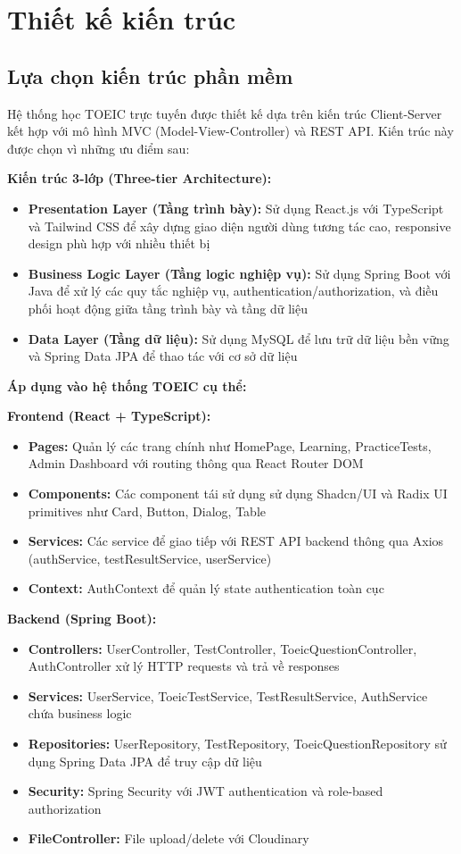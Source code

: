 \documentclass[../DoAn.tex]{subfiles}
\begin{document}
\section{Thiết kế kiến trúc}
\subsection{Lựa chọn kiến trúc phần mềm}

Hệ thống học TOEIC trực tuyến được thiết kế dựa trên kiến trúc Client-Server kết hợp với mô hình MVC (Model-View-Controller) và REST API. Kiến trúc này được chọn vì những ưu điểm sau:

\textbf{Kiến trúc 3-lớp (Three-tier Architecture):}
\begin{itemize}
    \item \textbf{Presentation Layer (Tầng trình bày):} Sử dụng React.js với TypeScript và Tailwind CSS để xây dựng giao diện người dùng tương tác cao, responsive design phù hợp với nhiều thiết bị
    \item \textbf{Business Logic Layer (Tầng logic nghiệp vụ):} Sử dụng Spring Boot với Java để xử lý các quy tắc nghiệp vụ, authentication/authorization, và điều phối hoạt động giữa tầng trình bày và tầng dữ liệu
    \item \textbf{Data Layer (Tầng dữ liệu):} Sử dụng MySQL để lưu trữ dữ liệu bền vững và Spring Data JPA để thao tác với cơ sở dữ liệu
\end{itemize}

\textbf{Áp dụng vào hệ thống TOEIC cụ thể:}

\textbf{Frontend (React + TypeScript):}
\begin{itemize}
    \item \textbf{Pages:} Quản lý các trang chính như HomePage, Learning, PracticeTests, Admin Dashboard với routing thông qua React Router DOM
    \item \textbf{Components:} Các component tái sử dụng sử dụng Shadcn/UI và Radix UI primitives như Card, Button, Dialog, Table
    \item \textbf{Services:} Các service để giao tiếp với REST API backend thông qua Axios (authService, testResultService, userService)
    \item \textbf{Context:} AuthContext để quản lý state authentication toàn cục
\end{itemize}

\textbf{Backend (Spring Boot):}
\begin{itemize}
    \item \textbf{Controllers:} UserController, TestController, ToeicQuestionController, AuthController xử lý HTTP requests và trả về responses
    \item \textbf{Services:} UserService, ToeicTestService, TestResultService, AuthService chứa business logic
    \item \textbf{Repositories:} UserRepository, TestRepository, ToeicQuestionRepository sử dụng Spring Data JPA để truy cập dữ liệu
    \item \textbf{Security:} Spring Security với JWT authentication và role-based authorization
    \item \textbf{FileController:} File upload/delete với Cloudinary
\end{itemize}
\end{document}
